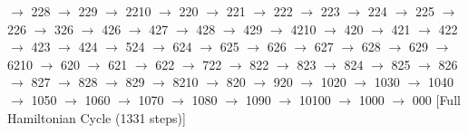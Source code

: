 $\rightarrow$ 228 $\rightarrow$ 229 $\rightarrow$ 2210 $\rightarrow$ 220 $\rightarrow$ 221 $\rightarrow$ 222 $\rightarrow$ 223 $\rightarrow$ 224 $\rightarrow$ 225 $\rightarrow$ 226 $\rightarrow$ 326 $\rightarrow$ 426 $\rightarrow$ 427 $\rightarrow$ 428 $\rightarrow$ 429 $\rightarrow$ 4210 $\rightarrow$ 420 $\rightarrow$ 421 $\rightarrow$ 422 $\rightarrow$ 423 $\rightarrow$ 424 $\rightarrow$ 524 $\rightarrow$ 624 $\rightarrow$ 625 $\rightarrow$ 626 $\rightarrow$ 627 $\rightarrow$ 628 $\rightarrow$ 629 $\rightarrow$ 6210 $\rightarrow$ 620 $\rightarrow$ 621 $\rightarrow$ 622 $\rightarrow$ 722 $\rightarrow$ 822 $\rightarrow$ 823 $\rightarrow$ 824 $\rightarrow$ 825 $\rightarrow$ 826 $\rightarrow$ 827 $\rightarrow$ 828 $\rightarrow$ 829 $\rightarrow$ 8210 $\rightarrow$ 820 $\rightarrow$ 920 $\rightarrow$ 1020 $\rightarrow$ 1030 $\rightarrow$ 1040 $\rightarrow$ 1050 $\rightarrow$ 1060 $\rightarrow$ 1070 $\rightarrow$ 1080 $\rightarrow$ 1090 $\rightarrow$ 10100 $\rightarrow$ 1000 $\rightarrow$ 000 [Full Hamiltonian Cycle (1331 steps)]

